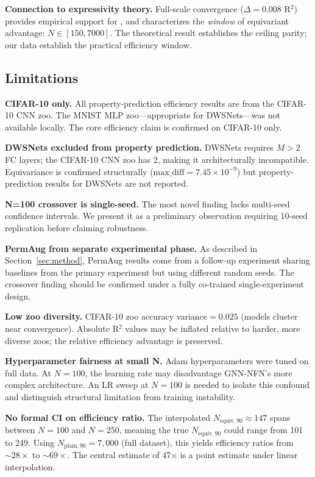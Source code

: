 \textbf{Connection to expressivity theory.} Full-scale convergence ($\Delta{=}0.008$ R$^2$) provides empirical support for \citet{Dayan2026Expressive}, and characterizes the \emph{window} of equivariant advantage: $N{\in}[150, 7000]$. The theoretical result establishes the ceiling parity; our data establish the practical efficiency window.

\subsection{Limitations}

\textbf{CIFAR-10 only.} All property-prediction efficiency results are from the CIFAR-10 CNN zoo. The MNIST MLP zoo---appropriate for DWSNets---was not available locally. The core efficiency claim is confirmed on CIFAR-10 only.

\textbf{DWSNets excluded from property prediction.} DWSNets requires $M{>}2$ FC layers; the CIFAR-10 CNN zoo has 2, making it architecturally incompatible. Equivariance is confirmed structurally ($\text{max\_diff}{=}7.45{\times}10^{-9}$) but property-prediction results for DWSNets are not reported.

\textbf{N=100 crossover is single-seed.} The most novel finding lacks multi-seed confidence intervals. We present it as a preliminary observation requiring 10-seed replication before claiming robustness.

\textbf{PermAug from separate experimental phase.} As described in Section~\ref{sec:method}, PermAug results come from a follow-up experiment sharing baselines from the primary experiment but using different random seeds. The crossover finding should be confirmed under a fully co-trained single-experiment design.

\textbf{Low zoo diversity.} CIFAR-10 zoo accuracy variance$=0.025$ (models cluster near convergence). Absolute R$^2$ values may be inflated relative to harder, more diverse zoos; the relative efficiency advantage is preserved.

\textbf{Hyperparameter fairness at small N.} Adam hyperparameters were tuned on full data. At $N{=}100$, the learning rate may disadvantage GNN-NFN's more complex architecture. An LR sweep at $N{=}100$ is needed to isolate this confound and distinguish structural limitation from training instability.

\textbf{No formal CI on efficiency ratio.} The interpolated $N_{\text{equiv},90}{\approx}147$ spans between $N{=}100$ and $N{=}250$, meaning the true $N_{\text{equiv},90}$ could range from 101 to 249. Using $N_{\text{plain},90}{=}7{,}000$ (full dataset), this yields efficiency ratios from ${\sim}28{\times}$ to ${\sim}69{\times}$. The central estimate of 47$\times$ is a point estimate under linear interpolation.


